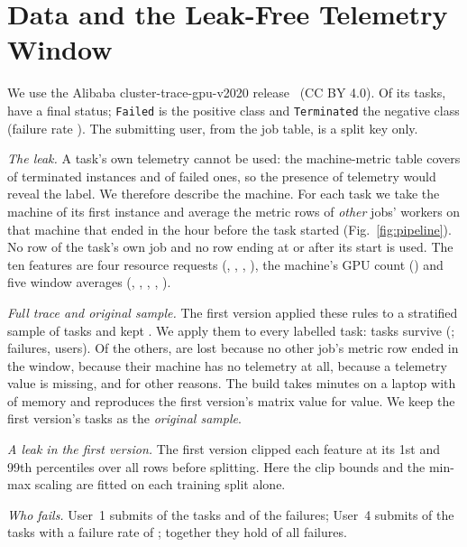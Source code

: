 \section{Data and the Leak-Free Telemetry Window}
\label{sec:data}

We use the Alibaba cluster-trace-gpu-v2020 release~\cite{weng2022mlaas} (CC BY 4.0). Of its  tasks,  have a final status; \texttt{Failed} is the positive class and \texttt{Terminated} the negative class (failure rate ). The submitting user, from the job table, is a split key only.

\emph{The leak.} A task's own telemetry cannot be used: the machine-metric table covers  of terminated instances and  of failed ones, so the presence of telemetry would reveal the label. We therefore describe the machine. For each task we take the machine of its first instance and average the metric rows of \emph{other} jobs' workers on that machine that ended in the hour before the task started (Fig.~\ref{fig:pipeline}). No row of the task's own job and no row ending at or after its start is used. The ten features are four resource requests (, , , ), the machine's GPU count () and five window averages (, , , , ).

\ifshowpipeline\fi

\emph{Full trace and original sample.} The first version applied these rules to a stratified sample of  tasks and kept . We apply them to every labelled task:  tasks survive (;  failures,  users). Of the others,  are lost because no other job's metric row ended in the window,  because their machine has no telemetry at all,  because a telemetry value is missing, and  for other reasons. The build takes  minutes on a laptop with  of memory and reproduces the first version's matrix value for value. We keep the first version's tasks as the \emph{original sample}.

\emph{A leak in the first version.} The first version clipped each feature at its 1st and 99th percentiles over all rows before splitting. Here the clip bounds and the min-max scaling are fitted on each training split alone.

\emph{Who fails.} User~1 submits  of the tasks and  of the failures; User~4 submits  of the tasks with a failure rate of ; together they hold  of all failures.
